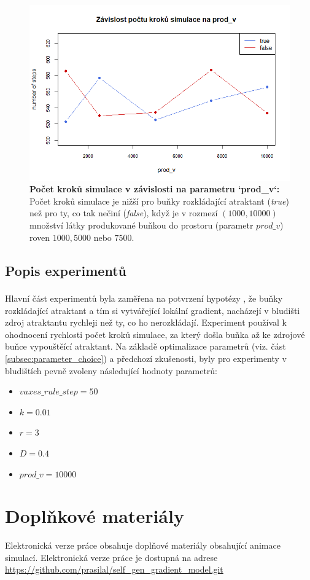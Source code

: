 \documentclass[10pt,a4paper,twocolumn]{article}
\begin{document}
\begin{figure}[tb]
  \centering
  \includegraphics[width=0.9\linewidth]{images/prod_v.png}
  \caption{\textbf{Počet kroků simulace v závislosti na parametru `prod\_v`:}
  Počet kroků simulace je nižší pro buňky rozkládající atraktant (\textit{true}) než pro ty, co tak nečiní (\textit{false}), když je v rozmezí $(1000,10000)$ množství látky produkované buňkou do prostoru (parametr $prod\_v$) roven $1000, 5000$ nebo $7500$.}
  \label{fig:prod_v}
\end{figure}



\subsection{Popis experimentů}
\label{subsec:experiment_description} 
Hlavní část experimentů byla zaměřena na potvrzení hypotézy \textsuperscript{\cite{tweedy2020}}, že buňky rozkládající atraktant a tím si vytvářející lokální gradient, nacházejí v bludišti zdroj atraktantu rychleji  než ty, co ho nerozkládají. 
Experiment používal k ohodnocení rychlosti počet kroků simulace, za který došla buňka až ke zdrojové buňce vypouštěící atraktant. Na základě optimalizace parametrů
(viz. část \ref{subsec:parameter_choice}) a předchozí zkušenosti, byly pro experimenty v bludištích pevně zvoleny následující hodnoty  parametrů:

\begin{itemize}
  \item $vaxes\_rule\_step = 50$
  \item $k = 0.01$
  \item $r = 3$
  \item $D = 0.4$
  \item $prod\_v = 10000$
\end{itemize}


\clearpage



\section*{Doplňkové materiály}
Elektronická verze práce obsahuje doplňové materiály obsahující
animace simulací. Elektronická verze práce je dostupná na adrese
\url{https://github.com/prasilal/self_gen_gradient_model.git}
\end{document}
